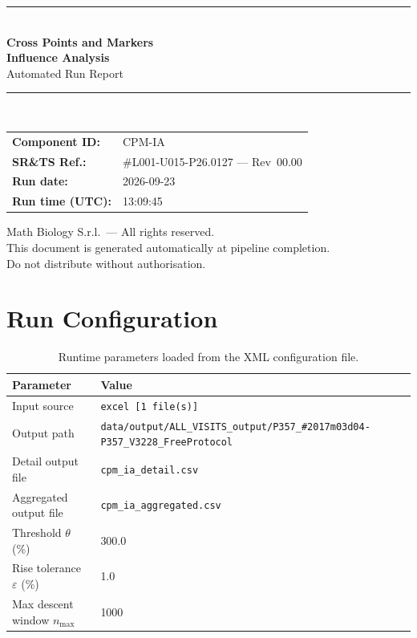 \documentclass[a4paper,11pt]{article}
\begin{document}
\begin{titlepage}
\begin{center}
  \vspace*{1.8cm}
  {\color{dmaaccent}\rule{\linewidth}{1.5pt}}\\[0.6cm]
  {\LARGE\bfseries\color{dmaaccent}
    Cross Points and Markers\\[0.25cm]
    Influence Analysis}\\[0.4cm]
  {\Large Automated Run Report}\\[0.3cm]
  {\color{dmaaccent}\rule{\linewidth}{1.5pt}}\\[2cm]

  \begin{tabular}{ll}
    \textbf{Component ID:}   & CPM-IA \\[0.3cm]
    \textbf{SR\&TS Ref.:}    & \#L001-U015-P26.0127 --- Rev~00.00 \\[0.3cm]
    \textbf{Run date:}       & 2026-09-23 \\[0.3cm]
    \textbf{Run time (UTC):} & 13:09:45 \\
  \end{tabular}

  \vfill
  {\color{dmagray}\small
    Math Biology S.r.l.\ --- All rights reserved.\\
    This document is generated automatically at pipeline completion.\\
    Do not distribute without authorisation.}
\end{center}
\end{titlepage}

\tableofcontents
\clearpage

\section{Run Configuration}

\begin{table}[h!]
\centering
\small
\caption{Runtime parameters loaded from the XML configuration file.}
\begin{tabular}{ll}
\toprule
\textbf{Parameter} & \textbf{Value} \\
\midrule
Input source                      & \texttt{excel [1 file(s)]} \\
Output path                       & \texttt{data/output/ALL\_VISITS\_output/P357\_\#2017m03d04-P357\_V3228\_FreeProtocol} \\
Detail output file                & \texttt{cpm\_ia\_detail.csv} \\
Aggregated output file            & \texttt{cpm\_ia\_aggregated.csv} \\
Threshold $\theta$ (\%)           & 300.0 \\
Rise tolerance $\varepsilon$ (\%) & 1.0 \\
Max descent window $n_{\max}$     & 1000 \\
\bottomrule
\end{tabular}
\end{table}
\end{document}
